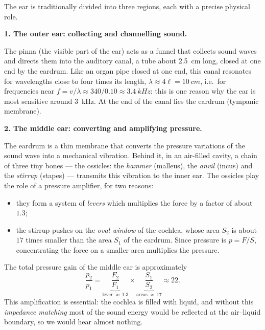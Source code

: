 \documentclass[11pt]{article}
\newcommand{\cle}[1]{{\popxbold\color{popdark}#1}}
\begin{document}
The ear is traditionally divided into three regions, each with a precise physical role.

\textbf{1. The outer ear: collecting and channelling sound.}\par
The \cle{pinna} (the visible part of the ear) acts as a funnel that collects sound waves and directs them into the \cle{auditory canal}, a tube about \SI{2.5}{cm} long, closed at one end by the eardrum. Like an organ pipe closed at one end, this canal resonates for wavelengths close to four times its length, $\lambda \approx 4\ell = \SI{10}{cm}$, i.e.\ for frequencies near $f = v/\lambda \approx 340/0.10 \approx \SI{3.4}{kHz}$: this is one reason why the ear is most sensitive around \SI{3}{kHz}. At the end of the canal lies the \cle{eardrum} (tympanic membrane).

\textbf{2. The middle ear: converting and amplifying pressure.}\par
The eardrum is a thin membrane that converts the pressure variations of the sound wave into a \cle{mechanical vibration}. Behind it, in an air-filled cavity, a chain of three tiny bones --- the \cle{ossicles}: the \emph{hammer} (malleus), the \emph{anvil} (incus) and the \emph{stirrup} (stapes) --- transmits this vibration to the inner ear. The ossicles play the role of a \cle{pressure amplifier}, for two reasons:
\begin{itemize}
\item they form a system of \emph{levers} which multiplies the force by a factor of about $1.3$;
\item the stirrup pushes on the \emph{oval window} of the cochlea, whose area $S_2$ is about $17$ times smaller than the area $S_1$ of the eardrum. Since pressure is $p = F/S$, concentrating the force on a smaller area multiplies the pressure.
\end{itemize}

\begin{propriete}
The total pressure gain of the middle ear is approximately
\[
\frac{p_2}{p_1} = \underbrace{\frac{F_2}{F_1}}_{\text{lever } \approx\, 1.3} \times \underbrace{\frac{S_1}{S_2}}_{\text{areas } \approx\, 17} \approx 22 .
\]
This amplification is essential: the cochlea is filled with liquid, and without this \emph{impedance matching} most of the sound energy would be reflected at the air--liquid boundary, so we would hear almost nothing.
\end{propriete}
\end{document}

